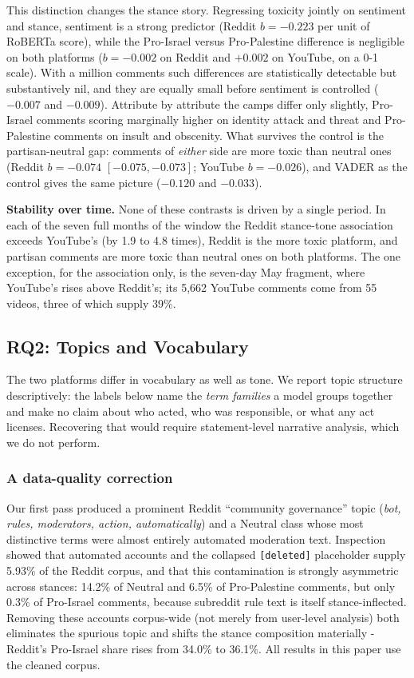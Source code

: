 \documentclass[pdflatex,sn-basic,Numbered,iicol]{sn-jnl}
\begin{document}
This distinction changes the stance story. Regressing toxicity jointly on sentiment
and stance, sentiment is a strong predictor (Reddit $b=-0.223$ per unit of RoBERTa
score), while the Pro-Israel versus Pro-Palestine difference is negligible on both
platforms ($b=-0.002$ on Reddit and $+0.002$ on YouTube, on a 0-1 scale). With a
million comments such differences are statistically detectable but substantively
nil, and they are equally small before sentiment is controlled ($-0.007$ and
$-0.009$). Attribute by attribute the camps differ only slightly, Pro-Israel
comments scoring marginally higher on identity attack and threat and Pro-Palestine
comments on insult and obscenity. What survives the control is the partisan-neutral
gap: comments of \emph{either} side are more toxic than neutral ones (Reddit
$b=-0.074$ $[-0.075, -0.073]$; YouTube $b=-0.026$), and VADER as the control gives
the same picture ($-0.120$ and $-0.033$).

\textbf{Stability over time.} None of these contrasts is driven by a single period.
In each of the seven full months of the window the Reddit stance-tone association
exceeds YouTube's (by 1.9 to 4.8 times), Reddit is the more toxic platform, and
partisan comments are more toxic than neutral ones on both platforms. The one
exception, for the association only, is the seven-day May fragment, where YouTube's
rises above Reddit's; its 5{,}662 YouTube comments come from 55 videos, three of
which supply 39\%.

\subsection{RQ2: Topics and Vocabulary}
The two platforms differ in vocabulary as well as tone. We report topic structure
descriptively: the labels below name the \emph{term families} a model groups
together and make no claim about who acted, who was responsible, or what any act
licenses. Recovering that would require statement-level narrative analysis, which we
do not perform.

\subsubsection{A data-quality correction}
Our first pass produced a prominent Reddit ``community governance'' topic
(\textit{bot, rules, moderators, action, automatically}) and a Neutral class whose
most distinctive terms were almost entirely automated moderation text. Inspection
showed that automated accounts and the collapsed \texttt{[deleted]} placeholder
supply 5.93\% of the Reddit corpus, and that this contamination is strongly
asymmetric across stances: 14.2\% of Neutral and 6.5\% of Pro-Palestine comments,
but only 0.3\% of Pro-Israel comments, because subreddit rule text is itself
stance-inflected. Removing these accounts corpus-wide (not merely from user-level
analysis) both eliminates the spurious topic and shifts the stance composition
materially - Reddit's Pro-Israel share rises from 34.0\% to 36.1\%. All results in
this paper use the cleaned corpus.
\end{document}
